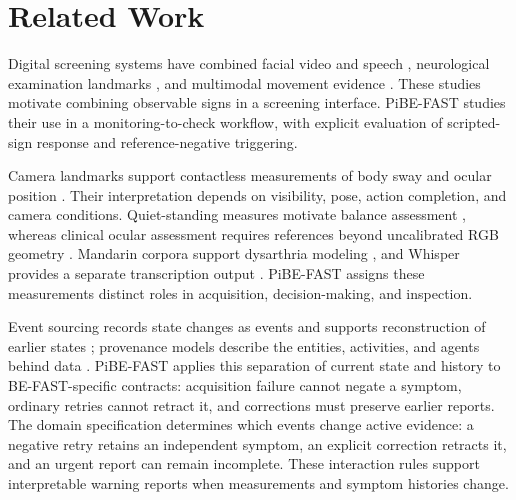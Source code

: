 \section{Related Work}
Digital screening systems have combined facial video and speech \cite{cai2022deepstroke}, neurological examination landmarks \cite{lee2022skeleton}, and multimodal movement evidence \cite{ou2025multimodal}. These studies motivate combining observable signs in a screening interface. PiBE-FAST studies their use in a monitoring-to-check workflow, with explicit evaluation of scripted-sign response and reference-negative triggering.

Camera landmarks support contactless measurements of body sway and ocular position \cite{yeung2014kinect,bazarevsky2020mediapipeiris}. Their interpretation depends on visibility, pose, action completion, and camera conditions. Quiet-standing measures motivate balance assessment \cite{ruhe2010cop}, whereas clinical ocular assessment requires references beyond uncalibrated RGB geometry \cite{kudo2021eyemovement}. Mandarin corpora support dysarthria modeling \cite{gao2024mdsc}, and Whisper provides a separate transcription output \cite{radford2023whisper}. PiBE-FAST assigns these measurements distinct roles in acquisition, decision-making, and inspection.

Event sourcing records state changes as events and supports reconstruction of earlier states \cite{fowler2005eventsourcing}; provenance models describe the entities, activities, and agents behind data \cite{groth2013prov}. PiBE-FAST applies this separation of current state and history to BE-FAST-specific contracts: acquisition failure cannot negate a symptom, ordinary retries cannot retract it, and corrections must preserve earlier reports. The domain specification determines which events change active evidence: a negative retry retains an independent symptom, an explicit correction retracts it, and an urgent report can remain incomplete. These interaction rules support interpretable warning reports when measurements and symptom histories change.
